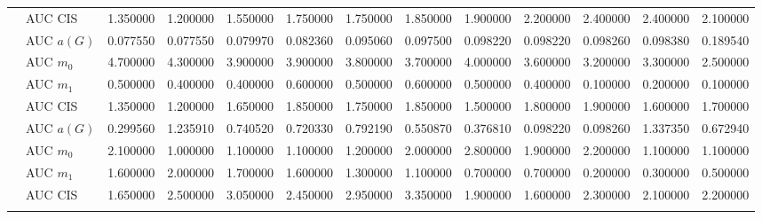 \begin{table}[htbp]
\begin{tabular}{llrrrrrrrrrrr}
    & AUC CIS & 1.350000 & 1.200000 & 1.550000 & 1.750000 & 1.750000 & 1.850000 & 1.900000 & 2.200000 & 2.400000 & 2.400000 & 2.100000 \\
    \addlinespace
    \multirow{4}{*}{degree} & AUC $a(G)$ & 0.077550 & 0.077550 & 0.079970 & 0.082360 & 0.095060 & 0.097500 & 0.098220 & 0.098220 & 0.098260 & 0.098380 & 0.189540 \\
    & AUC $m_0$ & 4.700000 & 4.300000 & 3.900000 & 3.900000 & 3.800000 & 3.700000 & 4.000000 & 3.600000 & 3.200000 & 3.300000 & 2.500000 \\
    & AUC $m_1$ & 0.500000 & 0.400000 & 0.400000 & 0.600000 & 0.500000 & 0.600000 & 0.500000 & 0.400000 & 0.100000 & 0.200000 & 0.100000 \\
    & AUC CIS & 1.350000 & 1.200000 & 1.650000 & 1.850000 & 1.750000 & 1.850000 & 1.500000 & 1.800000 & 1.900000 & 1.600000 & 1.700000 \\
    \addlinespace
    \multirow{4}{*}{random} & AUC $a(G)$ & 0.299560 & 1.235910 & 0.740520 & 0.720330 & 0.792190 & 0.550870 & 0.376810 & 0.098220 & 0.098260 & 1.337350 & 0.672940 \\
    & AUC $m_0$ & 2.100000 & 1.000000 & 1.100000 & 1.100000 & 1.200000 & 2.000000 & 2.800000 & 1.900000 & 2.200000 & 1.100000 & 1.100000 \\
    & AUC $m_1$ & 1.600000 & 2.000000 & 1.700000 & 1.600000 & 1.300000 & 1.100000 & 0.700000 & 0.700000 & 0.200000 & 0.300000 & 0.500000 \\
    & AUC CIS & 1.650000 & 2.500000 & 3.050000 & 2.450000 & 2.950000 & 3.350000 & 1.900000 & 1.600000 & 2.300000 & 2.100000 & 2.200000 \\
    \addlinespace
    \bottomrule
  \end{tabular}
\end{table}

